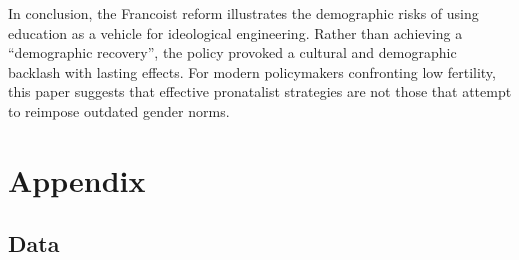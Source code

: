 \documentclass[a4paper,oneside,final,onecolumn,12pt,english]{article}
\begin{document}
In conclusion, the Francoist reform illustrates the demographic risks of using education as a vehicle for ideological engineering. Rather than achieving a “demographic recovery”, the policy provoked a cultural and demographic backlash with lasting effects. For modern policymakers confronting low fertility, this paper suggests that effective pronatalist strategies are not those that attempt to reimpose outdated gender norms.


\clearpage
\justifying 
\printbibliography


%
%
 \pagebreak
\section*{Appendix}

\renewcommand{\thesection}{\Alph{section}}
\renewcommand{\thesubsection}{\Alph{subsection}}

\setcounter{table}{0}
\renewcommand{\thetable}{\Alph{subsection}\arabic{table}}

\setcounter{figure}{0}
\renewcommand{\thefigure}{ \Alph{subsection}\arabic{figure}}



\subsection{Data }


\label{table:summary}
\end{document}

